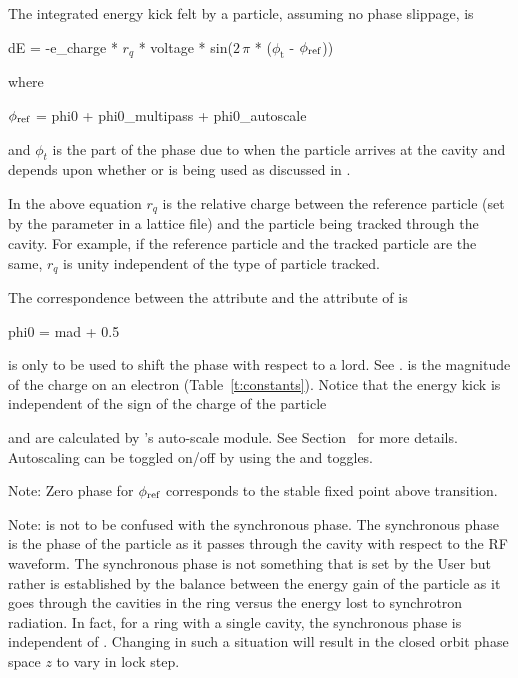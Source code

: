 {The integrated energy kick felt by a particle, assuming no phase slippage, is 
\begin{example}
  dE = -e_charge * \(r_q\) * voltage * sin(\(2\,\pi\) * (\(\phi_\text{t}\) - \(\phi_{\text{ref}}\)))
\end{example}
where
\begin{example}
  \(\phi_{\text{ref}}\) = phi0 + phi0_multipass + phi0_autoscale
  \label{rfcav.phi}
\end{example}
and $\phi_t$ is the part of the phase due to when the particle arrives at the cavity and depends
upon whether  or  is being used as discussed
in .

In the above equation $r_q$ is the relative charge between the reference particle (set by the
 parameter in a lattice file) and the particle being tracked through the
cavity. For example, if the reference particle and the tracked particle are the same, $r_q$ is
unity independent of the type of particle tracked.

The correspondence between the \bmad {} attribute and the  attribute of
\mad is
\begin{example}
  phi0 = mad + 0.5
\end{example}

 is only to be used to shift the phase with respect to a  lord. See
.  is the magnitude of the charge on an electron
(Table~\ref{t:constants}). Notice that the energy kick is independent of the sign of the charge of
the particle

 and  are calculated by \bmad's auto-scale module. See
Section~ for more details. Autoscaling can be toggled on/off by using the
 and  toggles.

Note: Zero phase for $\phi_{\text{ref}}$ corresponds to the stable fixed point above transition.

Note:  is not to be confused with the synchronous phase. The synchronous phase is the phase
of the particle as it passes through the cavity with respect to the RF waveform. The synchronous
phase is not something that is set by the User but rather is established by the balance between the
energy gain of the particle as it goes through the cavities in the ring versus the energy lost to
synchrotron radiation. In fact, for a ring with a single cavity, the synchronous phase is independent
of . Changing  in such a situation will result in the closed orbit phase space $z$ to
vary in lock step.

}
